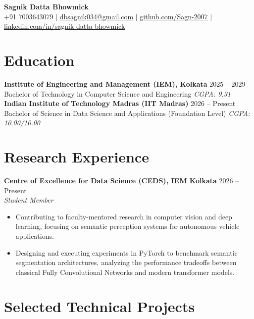 \documentclass[10pt, a4paper]{article}
\begin{document}
\pagestyle{empty}

\begin{center}
    {\huge \textbf{Sagnik Datta Bhowmick}} \\ \vspace{2pt}
    +91 7003643079 $|$ \href{mailto:dbsagnik034@gmail.com}{dbsagnik034@gmail.com} $|$ \href{https://github.com/Sagn-2007}{github.com/Sagn-2007} $|$ \href{https://www.linkedin.com/in/sagnik-datta-bhowmick}{linkedin.com/in/sagnik-datta-bhowmick}
\end{center}

\vspace{-10pt}

\section{Education}
\textbf{Institute of Engineering and Management (IEM), Kolkata} \hfill 2025 -- 2029 \\
Bachelor of Technology in Computer Science and Engineering \hfill \textit{CGPA: 9.31} \\[2pt]
\textbf{Indian Institute of Technology Madras (IIT Madras)} \hfill 2026 -- Present \\
Bachelor of Science in Data Science and Applications (Foundation Level) \hfill \textit{CGPA: 10.00/10.00}

\section{Research Experience}
\textbf{Centre of Excellence for Data Science (CEDS), IEM Kolkata} \hfill 2026 -- Present \\
\textit{Student Member}
\begin{itemize}[leftmargin=*, noitemsep, topsep=1pt, parsep=0pt]
    \item Contributing to faculty-mentored research in computer vision and deep learning, focusing on semantic perception systems for autonomous vehicle applications.
    \item Designing and executing experiments in PyTorch to benchmark semantic segmentation architectures, analyzing the performance tradeoffs between classical Fully Convolutional Networks and modern transformer models.
\end{itemize}

\section{Selected Technical Projects}
\end{document}
